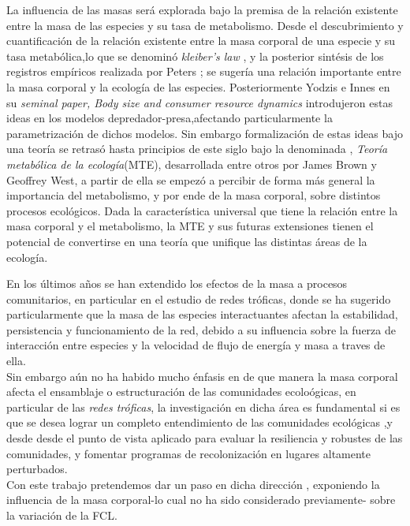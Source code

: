 La influencia de las masas ser\'a explorada bajo la premisa de la relaci\'on existente entre la masa de las especies y su tasa de metabolismo. Desde el descubrimiento y cuantificaci\'on de la relaci\'on existente entre la masa corporal de una especie y su tasa metab\'olica,lo que se denomin\'o \emph{kleiber's law} \citep{kleiber1961fire}, y la posterior sint\'esis de los registros emp\'iricos realizada por Peters \citep{peters1986ecological}; se suger\'ia una relaci\'on importante entre la masa corporal y la ecolog\'ia de las especies. Posteriormente Yodzis e Innes en su \emph{seminal paper, Body size and consumer resource dynamics}\citep{yodzis1992body} introdujeron estas ideas en los modelos depredador-presa,afectando particularmente la parametrizaci\'on de dichos modelos. Sin embargo formalizaci\'on de estas ideas bajo una teor\'ia se retras\'o hasta principios de este siglo bajo la denominada , \emph{Teor\'ia metab\'olica de la ecolog\'ia}(MTE), desarrollada entre otros por James Brown y Geoffrey West\citep{brown2004toward}, a partir de ella se empez\'o a percibir de forma m\'as general la importancia del metabolismo, y por ende de la masa corporal, sobre distintos procesos ecol\'ogicos. Dada la caracter\'istica universal que tiene la relaci\'on entre la masa corporal y el metabolismo, la MTE y sus futuras extensiones tienen el potencial de convertirse en una teor\'ia que unifique las distintas \'areas de la ecolog\'ia.

En los \'ultimos a\~nos se han extendido los efectos de la masa a procesos comunitarios, en particular en el estudio de redes tr\'oficas, donde se ha sugerido particularmente que la masa de las especies interactuantes afectan la estabilidad, persistencia y funcionamiento de la red, debido a su influencia sobre la fuerza de interacci\'on entre especies y la velocidad de flujo de energ\'ia y masa a traves de ella. \citep{brose2006allometric,mccann2011food}\\

Sin embargo a\'un no ha habido mucho \'enfasis en de que manera la masa corporal afecta el ensamblaje o estructuraci\'on de las comunidades ecolo\'ogicas, en particular de las \emph{redes tr\'oficas}, la investigaci\'on en dicha \'area es fundamental si es que se desea lograr un completo entendimiento de las comunidades ecol\'ogicas ,y desde desde el punto de vista aplicado para evaluar la resiliencia y robustes de las comunidades, y fomentar programas de recolonizaci\'on en lugares altamente perturbados.\\

Con este trabajo pretendemos dar un paso en dicha direcci\'on , exponiendo la influencia de la masa corporal-lo cual no ha sido considerado previamente- sobre la variaci\'on de la FCL.

